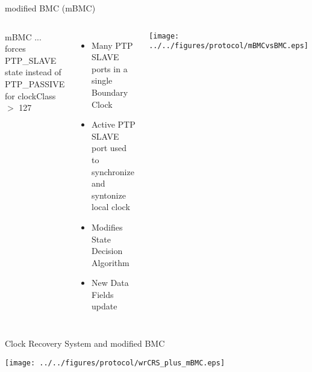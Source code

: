 \documentclass[compress,red]{beamer}
\begin{document}
\begin{frame}{modified BMC (mBMC)}

\begin{columns}[c]

    \begin{block}{mBMC}
    ... forces PTP\_SLAVE state instead of PTP\_PASSIVE for clockClass $>$ 127
    \end{block}

    \begin{itemize}
	\item Many PTP SLAVE ports in a single Boundary Clock
	\item Active PTP SLAVE port used to synchronize and syntonize local clock
	\item Modifies State Decision Algorithm
	\item New Data Fields update
      \end{itemize}

    \begin{center}
    \texttt{[image: ../../figures/protocol/mBMCvsBMC.eps]}
    \end{center}

\end{columns}

\end{frame}
\begin{frame}{Clock Recovery System and modified BMC}


  \begin{center}
  \texttt{[image: ../../figures/protocol/wrCRS\_plus\_mBMC.eps]}
  \end{center}

\end{frame}
\end{document}
